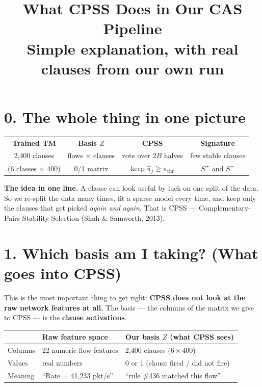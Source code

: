 \documentclass[11pt]{article}
\title{\color{darkblue}\textbf{What CPSS Does in Our CAS Pipeline}\\[2pt]
\large Simple explanation, with real clauses from our own run}
\author{}
\date{}
\newcommand{\qbox}[1]{\vspace{2pt}\noindent\colorbox{boxgray}{\parbox{\dimexpr\linewidth-2\fboxsep}{#1}}\vspace{3pt}}
\begin{document}
\maketitle
\vspace{-1.5em}

\section*{0. The whole thing in one picture}

\begin{center}
\begin{tabular}{@{}c@{\;\;$\rightarrow$\;\;}c@{\;\;$\rightarrow$\;\;}c@{\;\;$\rightarrow$\;\;}c@{}}
\textbf{Trained TM} & \textbf{Basis $Z$} & \textbf{CPSS} & \textbf{Signature} \\
2{,}400 clauses & flows $\times$ clauses & vote over $2B$ halves & few stable clauses \\
(6 classes $\times$ 400) & 0/1 matrix & keep $\hat\pi_j\ge\pi_{\mathrm{thr}}$ & $S^+$ and $S^-$ \\
\end{tabular}
\end{center}

\qbox{\textbf{The idea in one line.} A clause can look useful by luck on one
split of the data. So we re-split the data many times, fit a sparse model
every time, and keep only the clauses that get picked \emph{again and again}.
That is CPSS --- Complementary-Pairs Stability Selection
(Shah \& Samworth, 2013).}

\section*{1. Which basis am I taking? (What goes into CPSS)}

This is the most important thing to get right: \textbf{CPSS does not look at
the raw network features at all.} The basis --- the columns of the matrix we
give to CPSS --- is the \textbf{clause activations}.

\begin{center}
\begin{tabular}{@{}lll@{}}
\toprule
 & Raw feature space & \textbf{Our basis $Z$ (what CPSS sees)} \\
\midrule
Columns  & 22 numeric flow features & 2{,}400 clauses ($6\times400$) \\
Values   & real numbers             & 0 or 1 (clause fired / did not fire) \\
Meaning  & ``Rate = 41{,}233 pkt/s'' & ``rule \#436 matched this flow'' \\
\bottomrule
\end{tabular}
\end{center}
\end{document}
